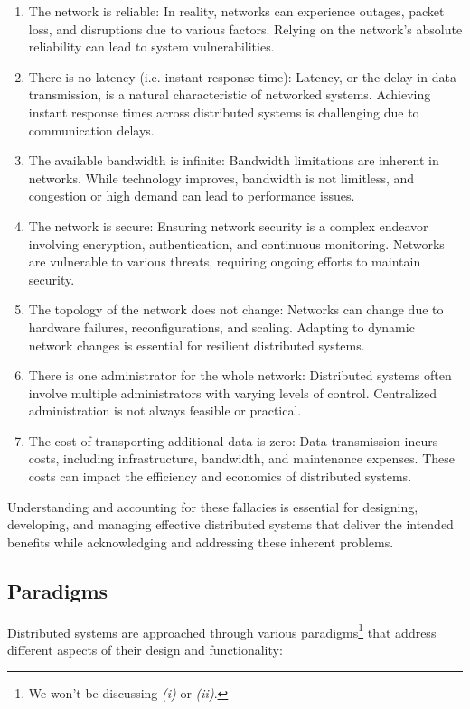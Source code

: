 \documentclass{report}
\begin{document}
\begin{enumerate}[label=\textit{(\roman*)}]
\item The network is reliable: In reality, networks can experience outages, packet loss, and
  disruptions due to various factors. Relying on the network's absolute reliability can lead to system
  vulnerabilities.
\item There is no latency (i.e. instant response time): Latency, or the delay in data transmission,
  is a natural characteristic of networked systems. Achieving instant response times across
  distributed systems is challenging due to communication delays.
\item The available bandwidth is infinite: Bandwidth limitations are inherent in networks. While
  technology improves, bandwidth is not limitless, and congestion or high demand can lead to
  performance issues.
\item The network is secure: Ensuring network security is a complex endeavor involving encryption,
  authentication, and continuous monitoring. Networks are vulnerable to various threats, requiring
  ongoing efforts to maintain security.
\item The topology of the network does not change: Networks can change due to hardware failures,
  reconfigurations, and scaling. Adapting to dynamic network changes is essential for resilient
  distributed systems.
\item There is one administrator for the whole network: Distributed systems often involve multiple
  administrators with varying levels of control. Centralized administration is not always feasible or
  practical.
\item The cost of transporting additional data is zero: Data transmission incurs costs, including
  infrastructure, bandwidth, and maintenance expenses. These costs can impact the efficiency and
  economics of distributed systems.
\end{enumerate}

Understanding and accounting for these fallacies is essential for designing, developing, and
managing effective distributed systems that deliver the intended benefits while acknowledging and
addressing these inherent problems.


\subsection{Paradigms}
Distributed systems are approached through various paradigms\footnote{We won't be discussing
  \textit{(i)} or \textit{(ii)}.} that address different aspects of their design and functionality:
\end{document}
